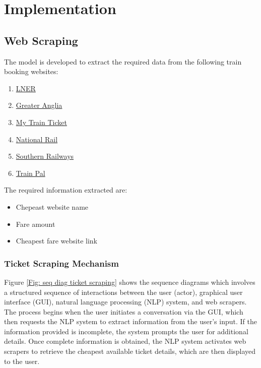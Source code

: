 \section{Implementation}
\subsection{Web Scraping}
The model is developed to extract the required data from the following train booking websites:
\begin{enumerate}
    \item \href{https://www.lner.co.uk/}{LNER}
    \item \href{https://www.greateranglia.co.uk/}{Greater Anglia}
    \item \href{https://www.mytrainticket.co.uk/}{My Train Ticket}
    \item \href{https://www.nationalrail.co.uk/}{National Rail}
    \item \href{https://www.southernrailway.com/}{Southern Railways}
    \item \href{https://www.mytrainpal.com/}{Train Pal}
\end{enumerate}

\noindent
The required information extracted are:

\begin{itemize}
    \item Chepeast website name
    \item Fare amount
    \item Cheapest fare website link
\end{itemize} 

\subsubsection*{Ticket Scraping Mechanism}
Figure \ref{Fig: seq diag ticket scraping} shows the sequence diagrams which involves a structured sequence of interactions between the user (actor), graphical user interface (GUI), natural language processing (NLP) system, and web scrapers. The process begins when the user initiates a conversation via the GUI, which then requests the NLP system to extract information from the user's input. If the information provided is incomplete, the system prompts the user for additional details. Once complete information is obtained, the NLP system activates web scrapers to retrieve the cheapest available ticket details, which are then displayed to the user.\vspace{0.5cm}

